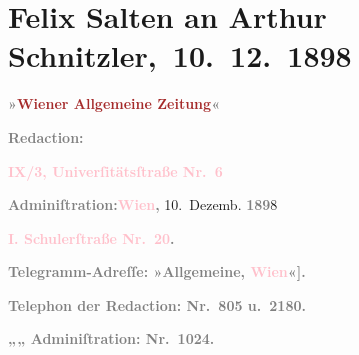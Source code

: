 

\renewcommand{\erwaehntePersonen}{Personen: Julius Szeps}
\renewcommand{\erwaehnteInstitutionen}{Institutionen: Wiener Allgemeine Zeitung}
\renewcommand{\erwaehnteOrte}{Orte: Paris, Schulerstraße, Universitätsstraße, Wien}
\renewcommand{\erwaehnteWerke}{}
\section[ Felix Salten an Arthur Schnitzler, 10. 12. 1898]{Felix Salten an Arthur Schnitzler, 10. 12. 1898}
\nopagebreak{}
\rehead{ }\normalsize\beginnumbering{}
\toendnotes[C]{\smallbreak\pagebreak[2]}
\pstart
           \noindent{}{\pb}\textcolor{gray}{\textbf{\textbf{»\textcolor{brown}{Wiener Allgemeine
                        Zeitung}{}\ledrightnote{\textcolor{brown}{Wiener Allgemeine Zeitung}}«}}}\pend
           
\pstart
           \textcolor{gray}{\textbf{Redaction:}}\pend
           
\pstart
           \textcolor{gray}{\textbf{\textbf{\textcolor{pink}{IX/3, Univerſitätsſtraße Nr. 6}{}\ledrightnote{\textcolor{pink}{Universitätsstraße}}}}}\pend
           
\pstart
           \textcolor{gray}{\textbf{Adminiſtration:}}\hfill \textcolor{gray}{\textbf{\textcolor{pink}{Wien}{}\ledrightnote{\textcolor{pink}{Wien}},}}{ }10. Dezemb. \textcolor{gray}{\textbf{189}}8\pend
           
\pstart
           \textcolor{gray}{\textbf{\textbf{\textcolor{pink}{I. Schulerſtraße Nr. 20}{}\ledrightnote{\textcolor{pink}{Schulerstraße}}.}}}\pend
           
\pstart
           \textcolor{gray}{\textbf{Telegramm-Adreſſe: »Allgemeine, \textcolor{pink}{Wien}{}\ledrightnote{\textcolor{pink}{Wien}}{[}«{]}.}}\pend
           
\pstart
           \textcolor{gray}{\textbf{Telephon der Redaction: Nr. 805 u. 2180.}}\pend
           
\pstart
           \textcolor{gray}{\textbf{\hspace*{1.5em}„\hspace*{1.5em}„\hspace*{1.5em} Adminiſtration: Nr. 1024.}}\pend
           
